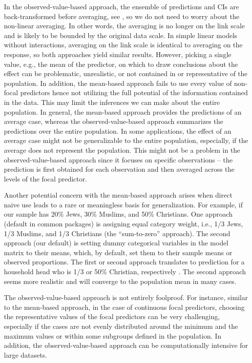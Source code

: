In the observed-value-based approach, the ensemble of predictions and CIs are back-transformed before averaging, see , so we do not need to worry about the non-linear averaging. In other words, the averaging is no longer on the link scale and is likely to be bounded by the original data scale. In simple linear models without interactions, averaging on the link scale is identical to averaging on the response, so both approaches yield similar results. However, picking a single value, e.g., the mean of the predictor, on which to draw conclusions about the effect can be problematic, unrealistic, or not contained in or representative of the population. In addition, the mean-based approach fails to use every value of non-focal predictors hence not utilizing the full potential of the information contained in the data. This may limit the inferences we can make about the entire population. In general, the mean-based approach provides the predictions of an average case, whereas the observed-value-based approach summarizes the predictions over the entire population. In some applications, the effect of an average case might not be generalizable to the entire population, especially, if the average does not represent the population. This might not be a problem in the observed-value-based approach since it focuses on specific observations -- the prediction is first obtained for each observation and then averaged across the levels of the focal predictor.

Another potential concern with the mean-based approach arises when direct naive use leads to a rare or meaningless basis for generalization. For example, if our sample has 20\% Jews, 30\% Muslims, and 50\% Christians. One approach (default in common packages) is assigning equal category weight, i.e., 1/3 Jews, 1/3 Muslims, and 1/3 Christians (the ``sum-to-zero'' approach). The second approach (our default) is setting dummy categorical variables in the model matrix to their means, which, by default, set them to their sample means or observed proportions. The first or second approach translates to prediction for a household head who is 1/3 or 50\% Christian, respectively \citep{hanmer2013behind}. The second approach seems more realistic and will converge to the population mean in many cases.

The observed-value-based approach is not entirely foolproof. For instance, similar to the mean-based approach, in the case of continuous focal predictors, choosing the representative values of the focal predictors can be very challenging, especially if the cases are not evenly distributed around the minimum and the maximum values or within some subgroups defined in the population. In addition, the observed-value-based approach can be computationally intensive for large datasets.



